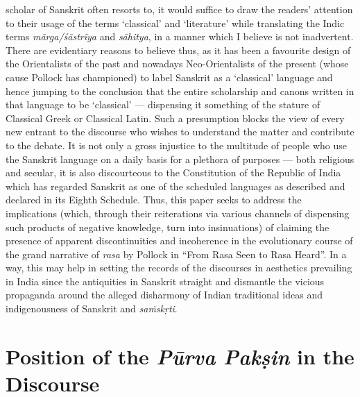 scholar of Sanskrit often resorts to, it would suffice to draw the readers’ attention to their usage of the terms ‘classical’ and ‘literature’ while translating the Indic terms \textsl{mārga/śāstrīya} and \textsl{sāhitya}, in a manner which I believe is not inadvertent. There are evidentiary reasons to believe thus, as it has been a favourite design of the Orientalists of the past and nowadays Neo-Orientalists of the present (whose cause Pollock has championed) to label Sanskrit as a ‘classical’ language and hence jumping to the conclusion that the entire scholarship and canons written in that language to be ‘classical’ --- dispensing it something of the stature of Classical Greek or Classical Latin. Such a presumption blocks the view of every new entrant to the discourse who wishes to understand the matter and contribute to the debate. It is not only a gross injustice to the multitude of people who use the Sanskrit language on a daily basis for a plethora of purposes --- both religious and secular, it is also discourteous to the Constitution of the Republic of India which has regarded Sanskrit as one of the scheduled languages as described and declared in its Eighth Schedule. Thus, this paper seeks to address the implications (which, through their reiterations via various channels of dispensing such products of negative knowledge, turn into insinuations) of claiming the presence of apparent discontinuities and incoherence in the evolutionary course of the grand narrative of \textsl{rasa} by Pollock in “From Rasa Seen to Rasa Heard”. In a way, this may help in setting the records of the discourses in aesthetics prevailing in India since the antiquities in Sanskrit straight and dismantle the vicious propaganda around the alleged disharmony of Indian traditional ideas and indigenousness of Sanskrit and \textsl{saṁskṛti}.\\[-21pt]

\section*{Position of the \textsl{Pūrva Pakṣin} in the Discourse}

